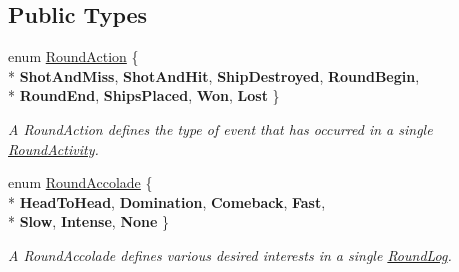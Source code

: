 \subsection*{Public Types}
\begin{DoxyCompactItemize}
\item 
enum \hyperlink{class_m_b_c_1_1_core_1_1_round_log_af3f9f76d90fb391108dd1eaeaeae27e4}{Round\-Action} \{ \\*
{\bfseries Shot\-And\-Miss}, 
{\bfseries Shot\-And\-Hit}, 
{\bfseries Ship\-Destroyed}, 
{\bfseries Round\-Begin}, 
\\*
{\bfseries Round\-End}, 
{\bfseries Ships\-Placed}, 
{\bfseries Won}, 
{\bfseries Lost}
 \}
\begin{DoxyCompactList}\small\item\em A Round\-Action defines the type of event that has occurred in a single \hyperlink{class_m_b_c_1_1_core_1_1_round_log_1_1_round_activity}{Round\-Activity}. \end{DoxyCompactList}\item 
enum \hyperlink{class_m_b_c_1_1_core_1_1_round_log_a4060830ca7135aa755ec5b6d24aa30e6}{Round\-Accolade} \{ \\*
{\bfseries Head\-To\-Head}, 
{\bfseries Domination}, 
{\bfseries Comeback}, 
{\bfseries Fast}, 
\\*
{\bfseries Slow}, 
{\bfseries Intense}, 
{\bfseries None}
 \}
\begin{DoxyCompactList}\small\item\em A Round\-Accolade defines various desired interests in a single \hyperlink{class_m_b_c_1_1_core_1_1_round_log}{Round\-Log}. \end{DoxyCompactList}\end{DoxyCompactItemize}
